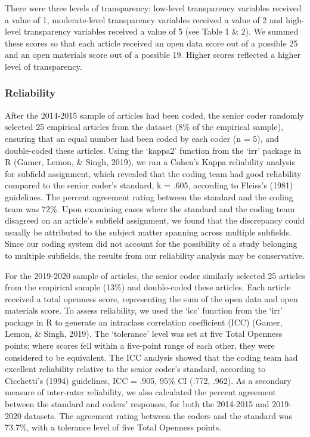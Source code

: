 \documentclass[
  english,
  man,floatsintext]{apa6}
\begin{document}
There were three levels of transparency: low-level transparency variables received a value of 1, moderate-level transparency variables received a value of 2 and high-level transparency variables received a value of 5 (see Table 1 \& 2). We summed these scores so that each article received an open data score out of a possible 25 and an open materials score out of a possible 19. Higher scores reflected a higher level of transparency.

\hypertarget{reliability}{%
\subsubsection{Reliability}\label{reliability}}

After the 2014-2015 sample of articles had been coded, the senior coder randomly selected 25 empirical articles from the dataset (8\% of the empirical sample), ensuring that an equal number had been coded by each coder (n = 5), and double-coded these articles. Using the `kappa2' function from the `irr' package in R (Gamer, Lemon, \& Singh, 2019), we ran a Cohen's Kappa reliability analysis for subfield assignment, which revealed that the coding team had good reliability compared to the senior coder's standard, k = .605, according to Fleiss's (1981) guidelines. The percent agreement rating between the standard and the coding team was 72\%. Upon examining cases where the standard and the coding team disagreed on an article's subfield assignment, we found that the discrepancy could usually be attributed to the subject matter spanning across multiple subfields. Since our coding system did not account for the possibility of a study belonging to multiple subfields, the results from our reliability analysis may be conservative.

For the 2019-2020 sample of articles, the senior coder similarly selected 25 articles from the empirical sample (13\%) and double-coded these articles. Each article received a total openness score, representing the sum of the open data and open materials score. To assess reliability, we used the `icc' function from the `irr' package in R to generate an intraclass correlation coefficient (ICC) (Gamer, Lemon, \& Singh, 2019). The `tolerance' level was set at five Total Openness points; where scores fell within a five-point range of each other, they were considered to be equivalent.
The ICC analysis showed that the coding team had excellent reliability relative to the senior coder's standard, according to Cicchetti's (1994) guidelines, ICC = .905, 95\% CI (.772, .962). As a secondary measure of inter-rater reliability, we also calculated the percent agreement between the standard and coders' responses, for both the 2014-2015 and 2019-2020 datasets. The agreement rating between the coders and the standard was 73.7\%, with a tolerance level of five Total Openness points.
\end{document}
